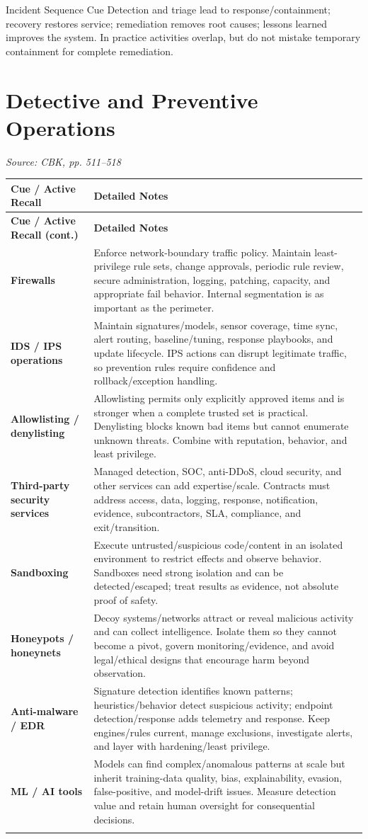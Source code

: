 \documentclass[10pt,letterpaper]{article}
\makeatletter
\newenvironment{cornell}{\rowcolors{2}{white}{notebg}\begin{longtable}{@{}>{\raggedright\arraybackslash\columncolor{cuebg}\color{navy}\bfseries}p{0.285\textwidth}>{\raggedright\arraybackslash}p{0.65\textwidth}@{}}\rowcolor{navy}\color{white}\textbf{Cue / Active Recall} & \color{white}\textbf{Detailed Notes}\\ \hline\endfirsthead\rowcolor{navy}\color{white}\textbf{Cue / Active Recall (cont.)} & \color{white}\textbf{Detailed Notes}\\ \hline\endhead}{\end{longtable}}
\newcommand{\noterow}[2]{#1 & #2\\\arrayrulecolor{line}\hline}\newcommand{\source}[1]{\par{\footnotesize\color{teal}\textit{Source: CBK, #1}}\par}
\makeatother
\begin{document}
\begin{exambox}{Incident Sequence Cue}
Detection and triage lead to response/containment; recovery restores service; remediation removes root causes; lessons learned improves the system. In practice activities overlap, but do not mistake temporary containment for complete remediation.
\end{exambox}

\section{\color{navy}Detective and Preventive Operations}
\source{pp. 511--518}
\begin{cornell}
\noterow{Firewalls}{Enforce network-boundary traffic policy. Maintain least-privilege rule sets, change approvals, periodic rule review, secure administration, logging, patching, capacity, and appropriate fail behavior. Internal segmentation is as important as the perimeter.}
\noterow{IDS / IPS operations}{Maintain signatures/models, sensor coverage, time sync, alert routing, baseline/tuning, response playbooks, and update lifecycle. IPS actions can disrupt legitimate traffic, so prevention rules require confidence and rollback/exception handling.}
\noterow{Allowlisting / denylisting}{Allowlisting permits only explicitly approved items and is stronger when a complete trusted set is practical. Denylisting blocks known bad items but cannot enumerate unknown threats. Combine with reputation, behavior, and least privilege.}
\noterow{Third-party security services}{Managed detection, SOC, anti-DDoS, cloud security, and other services can add expertise/scale. Contracts must address access, data, logging, response, notification, evidence, subcontractors, SLA, compliance, and exit/transition.}
\noterow{Sandboxing}{Execute untrusted/suspicious code/content in an isolated environment to restrict effects and observe behavior. Sandboxes need strong isolation and can be detected/escaped; treat results as evidence, not absolute proof of safety.}
\noterow{Honeypots / honeynets}{Decoy systems/networks attract or reveal malicious activity and can collect intelligence. Isolate them so they cannot become a pivot, govern monitoring/evidence, and avoid legal/ethical designs that encourage harm beyond observation.}
\noterow{Anti-malware / EDR}{Signature detection identifies known patterns; heuristics/behavior detect suspicious activity; endpoint detection/response adds telemetry and response. Keep engines/rules current, manage exclusions, investigate alerts, and layer with hardening/least privilege.}
\noterow{ML / AI tools}{Models can find complex/anomalous patterns at scale but inherit training-data quality, bias, explainability, evasion, false-positive, and model-drift issues. Measure detection value and retain human oversight for consequential decisions.}
\end{cornell}
\end{document}
